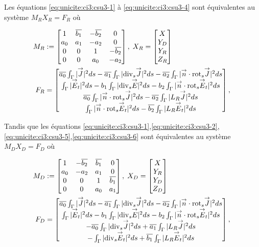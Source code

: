 Les équations \eqref{eq:unicite:ci3:csu3-1} à \eqref{eq:unicite:ci3:csu3-4} sont équivalentes au système $M_R X_R = F_R$ où

\begin{align*}
M_R&:=
\begin{bmatrix}
1&\conj{b_1}&-\conj{b_2}&0\\
a_0&a_1&-a_2&0\\
0&0&1&-\conj{b_2}\\
0&0&a_0&-a_2\\
\end{bmatrix},\;
X_R =
\begin{bmatrix}
X\\
Y_D\\
Y_R\\
Z_R
\end{bmatrix}\\
F_R &=
\begin{bmatrix}
\conj{a_0} \int_\Gamma |\vJ|^2ds - \conj{a_1} \int_\Gamma |\tdivs \vJ|^2 ds - \conj{a_2} \int_\Gamma |\vn \cdot \trots \vJ|^2 ds \\
\int_\Gamma |\vE_t|^2 ds  - b_1 \int_\Gamma | \tdivs \vE |^2 ds - b_2 \int_\Gamma | \vn \cdot \trots \vE_t|^2 ds \\
\conj{a_0} \int_\Gamma |\vn \cdot \trots \vJ|^2ds - \conj{a_2} \int_\Gamma | L_R \vJ|^2 ds \\
\int_\Gamma | \vn \cdot \trots \vE_t |^2 ds  - \conj{b_2} \int_\Gamma | L_R \vE_t|^2 ds
\end{bmatrix},\;
\end{align*}

Tandis que les équations \eqref{eq:unicite:ci3:csu3-1},\eqref{eq:unicite:ci3:csu3-2},\eqref{eq:unicite:ci3:csu3-5},\eqref{eq:unicite:ci3:csu3-6} sont équivalentes au système $M_D X_D= F_D$ où

\begin{align*}
M_D&:=
\begin{bmatrix}
1&-\conj{b_2}&\conj{b_1}&0\\
a_0&-a_2&a_1&0\\
0&0&1&\conj{b_1}\\
0&0&a_0&a_1\\
\end{bmatrix},\;
X_D =
\begin{bmatrix}
X\\
Y_R\\
Y_D\\
Z_D
\end{bmatrix}\\
F_D &=
\begin{bmatrix}
\conj{a_0} \int_\Gamma |\vJ|^2ds - \conj{a_1} \int_\Gamma |\tdivs \vJ|^2 ds - \conj{a_2} \int_\Gamma |\vn \cdot \trots \vJ|^2 ds \\
\int_\Gamma |\vE_t|^2 ds  - b_1 \int_\Gamma | \tdivs \vE |^2 ds - b_2 \int_\Gamma | \vn \cdot \trots \vE_t|^2 ds \\
-\conj{a_0} \int_\Gamma |\tdivs \vJ|^2ds + \conj{a_1} \int_\Gamma | L_R \vJ|^2 ds \\
-\int_\Gamma | \tdivs \vE_t |^2 ds  + \conj{b_1} \int_\Gamma | L_R \vE_t|^2 ds
\end{bmatrix},\;
\end{align*}

